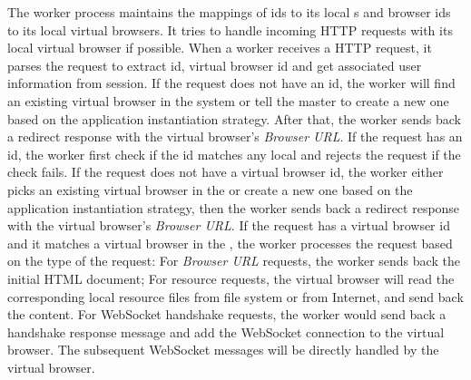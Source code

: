 The worker process maintains the mappings of \appins{} ids to its local
\appins{}s and browser ids to its local virtual browsers.
It tries to handle incoming HTTP requests with its local virtual browser
if possible.
When a worker receives a HTTP request, it parses the request to extract
\appins id, virtual browser id and get associated user information
from session. If the request does not
have an \appins id, the worker will find an existing virtual browser in the
system or tell the master to create a new one based on the application
instantiation strategy. After
that, the worker sends back a redirect response with the virtual browser's
\emph{Browser URL}. If the request has an \appins id, the worker first check
if the id matches any local \appins and rejects the request if the check
fails. If the request does not have a virtual browser id, the worker either
picks an existing virtual browser in the \appins  or create a new one based on
the application instantiation strategy, then the worker sends back a redirect
response with  the virtual browser's \emph{Browser URL}. If the request has a
virtual browser id and it matches a virtual browser in the \appins, the worker
processes the request based on the type of the request: For \emph{Browser URL}
requests, the worker sends back the initial  HTML document; For resource
requests, the virtual browser will read the corresponding local resource files
from file system or from Internet, and send back the content. For WebSocket
handshake requests, the worker would send back a handshake response message
and add the WebSocket connection to the virtual browser.
The subsequent WebSocket messages will be directly handled by the virtual browser.




